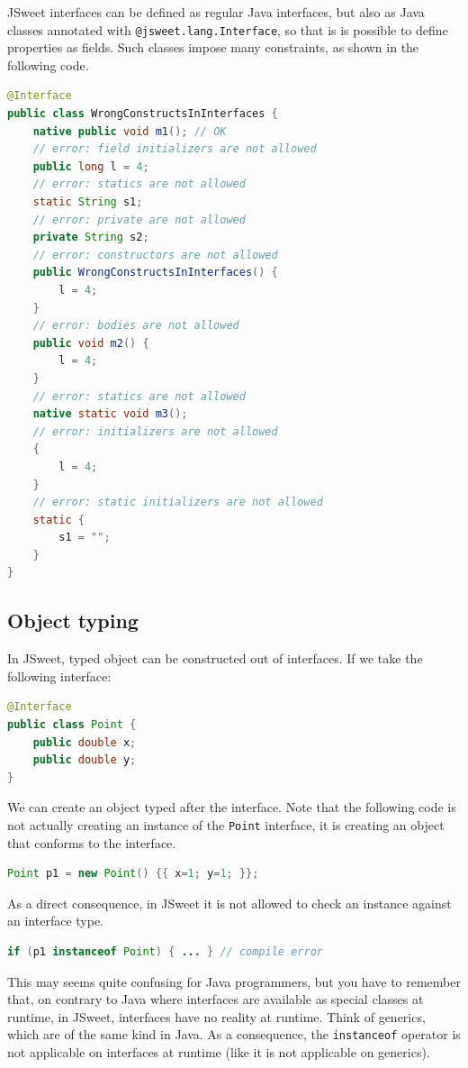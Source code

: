 \documentclass[a4paper]{report}
\begin{document}
JSweet interfaces can be defined as regular Java interfaces, but also as Java classes annotated with \texttt{@jsweet.lang.Interface}, so that is is possible to define properties as fields. Such classes impose many constraints, as shown in the following code.

\begin{lstlisting}[language=Java]
@Interface
public class WrongConstructsInInterfaces {
	native public void m1(); // OK
	// error: field initializers are not allowed
	public long l = 4;
	// error: statics are not allowed
	static String s1;
	// error: private are not allowed
	private String s2;
	// error: constructors are not allowed
	public WrongConstructsInInterfaces() {
		l = 4;
	}
	// error: bodies are not allowed
	public void m2() {
		l = 4;
	}
	// error: statics are not allowed
	native static void m3();
	// error: initializers are not allowed
	{
		l = 4;
	}
	// error: static initializers are not allowed
	static {
		s1 = "";
	}
}
\end{lstlisting}

\subsection{Object typing}

In JSweet, typed object can be constructed out of interfaces. If we take the following interface:

\begin{lstlisting}[language=Java]
@Interface
public class Point {
	public double x;
	public double y;
}
\end{lstlisting}

\noindent
We can create an object typed after the interface. Note that the following code is not actually creating an instance of the \texttt{Point} interface, it is creating an object that conforms to the interface. 

\begin{lstlisting}[language=Java]
Point p1 = new Point() {{ x=1; y=1; }};
\end{lstlisting}

\noindent
As a direct consequence, in JSweet it is not allowed to check an instance against an interface type.

\begin{lstlisting}[language=Java]
if (p1 instanceof Point) { ... } // compile error 
\end{lstlisting}

\noindent
This may seems quite confusing for Java programmers, but you have to remember that, on contrary to Java where interfaces are available as special classes at runtime, in JSweet, interfaces have no reality at runtime. Think of generics, which are of the same kind in Java. As a consequence, the \texttt{instanceof} operator is not applicable on interfaces at runtime (like it is not applicable on generics).
\end{document}
